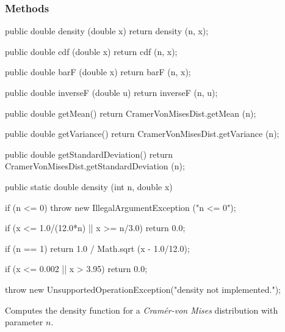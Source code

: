 \subsubsection* {Methods}

\begin{code}\begin{hide}

   public double density (double x) {
      return density (n, x);
   }

   public double cdf (double x) {
      return cdf (n, x);
   }

   public double barF (double x) {
      return barF (n, x);
   }

   public double inverseF (double u) {
      return inverseF (n, u);
   }

   public double getMean() {
      return CramerVonMisesDist.getMean (n);
   }

   public double getVariance() {
      return CramerVonMisesDist.getVariance (n);
   }

   public double getStandardDeviation() {
      return CramerVonMisesDist.getStandardDeviation (n);
   }\end{hide}

   public static double density (int n, double x)\begin{hide} {
      if (n <= 0)
        throw new IllegalArgumentException ("n <= 0");

      if (x <= 1.0/(12.0*n) || x >= n/3.0)
         return 0.0;

      if (n == 1)
         return 1.0 / Math.sqrt (x - 1.0/12.0);

      if (x <= 0.002 || x > 3.95)
         return 0.0;

      throw new UnsupportedOperationException("density not implemented.");
   }\end{hide}
\end{code}
\begin{tabb} Computes the density function
  for a {\em Cram\'er-von Mises\/} distribution with parameter $n$.
\end{tabb}
